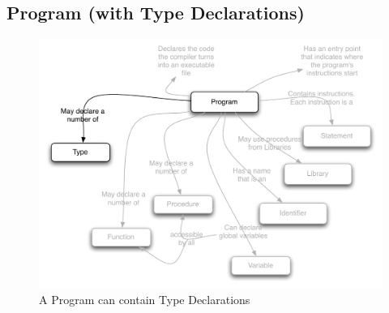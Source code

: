 \clearpage
\subsection{Program (with Type Declarations)} %
\label{sub:program_with_type_declarations_}

\begin{figure}[h]
   \centering
   \includegraphics[width=\textwidth]{./topics/type-decl/diagrams/ProgramWithTypes} 
   \caption{A Program can contain Type Declarations}
   \label{fig:type-decl-program}
\end{figure}

